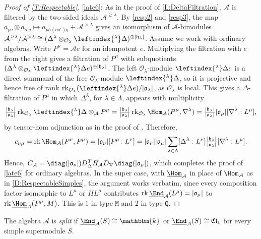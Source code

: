 \documentclass[a4paper,11pt]{amsart}
\newcommand{\uHom}{\underline{\Hom}}
\newcommand{\uEnd}{\underline{\End}}
\numberwithin{equation}{subsection}
\theoremstyle{definition}
\theoremstyle{theorem}
\theoremstyle{remark}
\DeclareMathOperator\Cl{\mathfrak{Cl}}
\newcommand\CA{\mathcal{A}}
\newcommand\CO{\mathcal{O}}
\newcommand\hlam[1][\lambda]{\mathfrak{h}_{#1}}
\newcommand\Olam[1][\lambda]{\CO_{#1}}
\newcommand\olam[1][\lambda]{\mathfrak{o}_{#1}}
\newcommand\op{\operatorname}
\newcommand\kk{\mathbbm{k}}
\begin{document}
\begin{proof}[Proof of \autoref{T:Respectable}]
     \autoref{late6}: As in the proof of \autoref{L:DeltaFiltration},
     $\CA$ is filtered by the two-sided ideals $\CA^{\ge\lambda}$. By
     \autoref{resp2} and \autoref{resp3}, the map
     $a_{po}\otimes a_{o'q}\mapsto a_{ph(oo')q}+\CA^{>\lambda}$ gives an isomorphism of
     $\CA$-bimodules
     $\CA^{\ge\lambda}/\CA^{>\lambda}
         \cong(\Delta^\lambda\otimes_{\Olam}\leftindex{^\lambda}\Delta)^{\oplus|\hlam|}$.
     Assume we work with ordinary algebras. Write $P^\mu=\CA e$ for an
     idempotent $e$. Multiplying the filtration with $e$ from the right
     gives a filtration of $P^\mu$ with subquotients
     $(\Delta^\lambda\otimes_{\Olam}\leftindex{^\lambda}\Delta e)^{\oplus|\hlam|}$.
     The left $\Olam$-module $\leftindex{^\lambda}\Delta e$ is a direct summand of
     the free $\Olam$-module $\leftindex{^\lambda}\Delta$, so it is projective and
     hence free of rank $\op{rk}_{\Olam}(\leftindex{^\lambda}\Delta e)/|\olam|$, as
     $\Olam$ is local. This gives a $\Delta$-filtration of $P^\mu$ in
     which $\Delta^\lambda$, for $\lambda\in\Lambda$, appears with
     multiplicity
     \[
       \tfrac{|\hlam|}{|\olam|}\op{rk}_{\Olam} \leftindex{^\lambda}\Delta\otimes_{\CA}P^\mu
        =\tfrac{|\hlam|}{|\olam|}\op{rk}_{\Olam}\Hom_{\CA}(P^\mu,\nabla^\lambda)
        =\tfrac{|\hlam|}{|\olam|}|\olam[\mu]|[\nabla^\lambda:L^\mu],
     \]
     by tensor-hom adjunction as in the proof of
     \cite[Lemma~2.19]{Mathas:ULect}. Therefore,
     \[
       c_{\nu\mu} = \op{rk}\Hom_{\CA}(P^\nu,P^\mu) =|\olam[\nu]|[P^\mu\colon L^\nu]
          =|\olam[\nu]||\olam[\mu]|\sum_{\lambda\in\Lambda} [\Delta^\lambda:L^\nu]
             \tfrac{|\hlam|}{|\olam|}[\nabla^\lambda:L^\mu].
     \]
     Hence,  $C_{\CA}=\diag(|\olam[\nu]|)D_\Delta^T H_{\CA} D_\nabla\diag(|\olam[\mu]|)$, which completes the proof of \autoref{late6} for ordinary algebras.
     In the super case, with $\uHom_{\CA}$ in place of $\Hom_{\CA}$ as in \autoref{D:RespectableSimples}, the argument works verbatim, since every composition factor isomorphic to $L^\mu$ or $\Pi L^\mu$ contributes $\op{rk}\uEnd_{\CA}(L^\mu)=|\olam[\mu]|$ to $\op{rk}\uHom_{\CA}(P^\mu,M)$. This is $1$ in type $\mathtt M$ and $2$ in type $\mathtt Q$.
  \end{proof}

The algebra $\CA$ is \emph{split} if $\uEnd_{\mathcal{A}}(S)\cong\kk$ or
$\uEnd_{\mathcal{A}}(S)\cong\Cl_1$ for every simple supermodule $S$.
\end{document}
